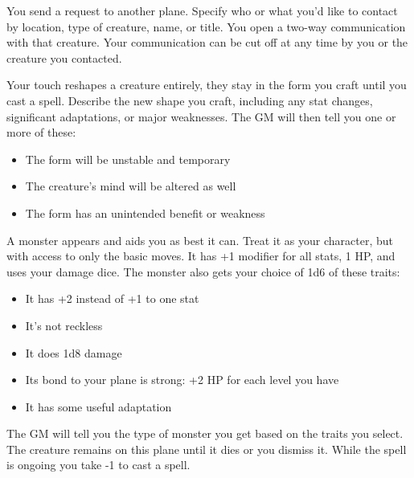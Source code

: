 You send a request to another plane. Specify who or what you'd like to contact by location, type of creature, name, or title. You open a two-way communication with that creature. Your communication can be cut off at any time by you or the creature you contacted.



Your touch reshapes a creature entirely, they stay in the form you craft until you cast a spell. Describe the new shape you craft, including any stat changes, significant adaptations, or major weaknesses. The GM will then tell you one or more of these:
\begin{itemize}
\item The form will be unstable and temporary
\item The creature's mind will be altered as well
\item The form has an unintended benefit or weakness

\end{itemize}

\newpage
{}


A monster appears and aids you as best it can. Treat it as your character, but with access to only the basic moves. It has +1 modifier for all stats, 1 HP, and uses your damage dice. The monster also gets your choice of 1d6 of these traits: 
\begin{itemize}
\item It has +2 instead of +1 to one stat
\item It's not reckless
\item It does 1d8 damage
\item Its bond to your plane is strong: +2 HP for each level you have
\item It has some useful adaptation

\end{itemize}

The GM will tell you the type of monster you get based on the traits you select. The creature remains on this plane until it dies or you dismiss it. While the spell is ongoing you take -1 to cast a spell.



